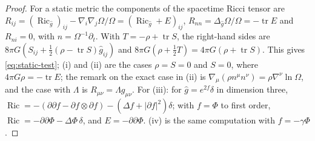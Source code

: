 \documentclass[a4paper,11pt]{article}
\theoremstyle{definition}
\theoremstyle{remark}
\DeclareMathOperator{\tr}{tr}
\DeclareMathOperator{\Ric}{Ric}
\begin{document}
\begin{proof}
For a static metric the components of the spacetime Ricci tensor are $R_{ij}=(\Ric_{\hat g})_{ij}-\nabla_i\nabla_j\Omega/\Omega=(\Ric_{\hat g}+E)_{ij}$, $R_{nn}=\Delta_{\hat g}\Omega/\Omega=-\tr E$ and $R_{ni}=0$, with $n=\Omega^{-1}\partial_t$. With $T=-\rho+\tr S$, the right-hand sides are $8\pi G(S_{ij}+\tfrac12(\rho-\tr S)\hat g_{ij})$ and $8\pi G(\rho+\tfrac12T)=4\pi G(\rho+\tr S)$. This gives \eqref{eq:static-test}; (i) and (ii) are the cases $\rho=S=0$ and $S=0$, where $4\pi G\rho=-\tr E$; the remark on the exact case in (ii) is $\nabla_\mu(\rho n^\mu n^\nu)=\rho\nabla^\nu\ln\Omega$, and the case with $\Lambda$ is $R_{\mu\nu}=\Lambda g_{\mu\nu}$. For (iii): for $\hat g=e^{2f}\delta$ in dimension three, $\Ric=-(\partial\partial f-\partial f\otimes\partial f)-(\Delta f+|\partial f|^2)\delta$; with $f=\Phi$ to first order, $\Ric=-\partial\partial\Phi-\Delta\Phi\,\delta$, and $E=-\partial\partial\Phi$. (iv) is the same computation with $f=-\gamma\Phi$.
\end{proof}
\end{document}
